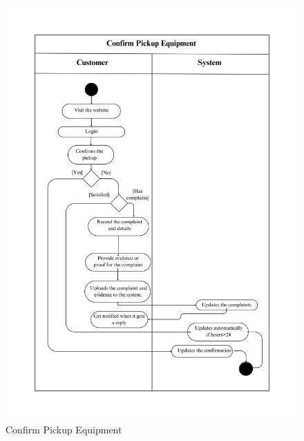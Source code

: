 \begin{figure}[h]
    \centering
    \includegraphics[width=1\textwidth]{Images/Activity Diagrams/34 Confirm Pickup Equipment.png}
    \caption{Confirm Pickup Equipment}
    \label{fig:activity-confirm-pickup}
\end{figure}

